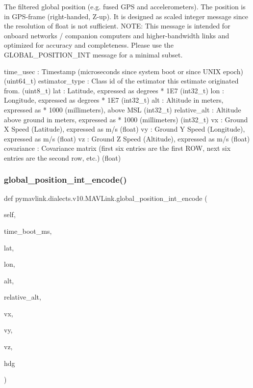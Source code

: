 \begin{DoxyVerb}
\begin{DoxyVerb}
\begin{DoxyVerb}The filtered global position (e.g. fused GPS and accelerometers). The
position is in GPS-frame (right-handed, Z-up). It  is
designed as scaled integer message since the
resolution of float is not sufficient. NOTE: This
message is intended for onboard networks / companion
computers and higher-bandwidth links and optimized for
accuracy and completeness. Please use the
GLOBAL_POSITION_INT message for a minimal subset.

time_usec                 : Timestamp (microseconds since system boot or since UNIX epoch) (uint64_t)
estimator_type            : Class id of the estimator this estimate originated from. (uint8_t)
lat                       : Latitude, expressed as degrees * 1E7 (int32_t)
lon                       : Longitude, expressed as degrees * 1E7 (int32_t)
alt                       : Altitude in meters, expressed as * 1000 (millimeters), above MSL (int32_t)
relative_alt              : Altitude above ground in meters, expressed as * 1000 (millimeters) (int32_t)
vx                        : Ground X Speed (Latitude), expressed as m/s (float)
vy                        : Ground Y Speed (Longitude), expressed as m/s (float)
vz                        : Ground Z Speed (Altitude), expressed as m/s (float)
covariance                : Covariance matrix (first six entries are the first ROW, next six entries are the second row, etc.) (float)\end{DoxyVerb}
 \mbox{\label{classpymavlink_1_1dialects_1_1v10_1_1MAVLink_a1c9eef8b7ef80ba684e5d88527ce6773}} 
\subsubsection{\texorpdfstring{global\+\_\+position\+\_\+int\+\_\+encode()}{global\_position\_int\_encode()}}
{\footnotesize\ttfamily def pymavlink.\+dialects.\+v10.\+M\+A\+V\+Link.\+global\+\_\+position\+\_\+int\+\_\+encode (\begin{DoxyParamCaption}\item[{}]{self,  }\item[{}]{time\+\_\+boot\+\_\+ms,  }\item[{}]{lat,  }\item[{}]{lon,  }\item[{}]{alt,  }\item[{}]{relative\+\_\+alt,  }\item[{}]{vx,  }\item[{}]{vy,  }\item[{}]{vz,  }\item[{}]{hdg }\end{DoxyParamCaption})}


\end{DoxyVerb}
\end{DoxyVerb}
